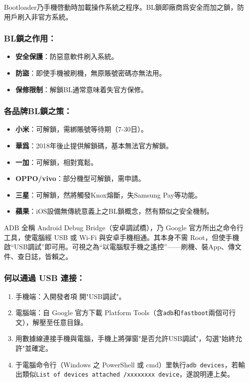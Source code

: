 
Bootloader乃手機啓動時加載操作系統之程序。BL鎖即廠商爲安全而加之鎖，防用戶刷入非官方系統。

\subsubsection*{BL鎖之作用：}

\begin{itemize}
  \item \textbf{安全保護}：防惡意軟件刷入系統。
  \item \textbf{防盜}：即使手機被刷機，無原賬號密碼亦無法用。
  \item \textbf{保修限制}：解鎖BL通常意味着失官方保修。
\end{itemize}

\subsubsection*{各品牌BL鎖之策：}

\begin{itemize}
  \item \textbf{小米}：可解鎖，需綁賬號等待期（7-30日）。
  \item \textbf{華爲}：2018年後止提供解鎖碼，基本無法官方解鎖。
  \item \textbf{一加}：可解鎖，相對寬鬆。
  \item \textbf{OPPO/vivo}：部分機型可解鎖，需申請。
  \item \textbf{三星}：可解鎖，然將觸發Knox熔斷，失Samsung Pay等功能。
  \item \textbf{蘋果}：iOS設備無傳統意義上之BL鎖概念，然有類似之安全機制。
\end{itemize}


ADB 全稱 Android Debug Bridge（安卓調試橋），乃 Google 官方所出之命令行工具，使電腦經 USB 或 Wi-Fi 與安卓手機相通。其本身不需 Root，但使手機啟“USB調試”即可用。可視之為“以電腦馭手機之遙控”——刷機、裝App、傳文件、查日誌，皆賴之。

\subsubsection*{何以通過 USB 連接：}

\begin{enumerate}
  \item 手機端：入開發者項 開"USB調試"。
  \item 電腦端：自 Google 官方下載 Platform Tools（含\texttt{adb}和\texttt{fastboot}兩個可行文），解壓至任意目錄。
  \item 用數據線連接手機與電腦，手機上將彈窗"是否允許USB調試"，勾選"始終允許"並確定。
  \item 于電腦命令行（Windows 之 PowerShell 或 cmd）里執行\texttt{adb devices}，若輸出類似\texttt{List of devices attached /\allowbreak  xxxxxxxx device}，遂說明連上矣。
\end{enumerate}

